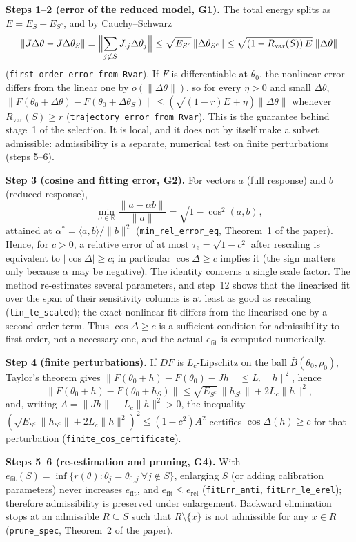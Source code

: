 \textbf{Steps 1--2 (error of the reduced model, G1).} The total energy splits as $E=E_S+E_{S^c}$, and by Cauchy--Schwarz
\[
\|J\Delta\theta-J\Delta\theta_S\|=\Bigl\|\sum_{j\notin S}J_{\cdot j}\Delta\theta_j\Bigr\|\le\sqrt{E_{S^c}}\,\|\Delta\theta_{S^c}\|\le\sqrt{(1-R_{\mathrm{var}}(S))\,E}\;\|\Delta\theta\|
\]
(\texttt{first\_order\_error\_from\_Rvar}). If $F$ is differentiable at $\theta_0$, the nonlinear error differs from the linear one by $o(\|\Delta\theta\|)$, so for every $\eta>0$ and small $\Delta\theta$, $\|F(\theta_0+\Delta\theta)-F(\theta_0+\Delta\theta_S)\|\le(\sqrt{(1-r)E}+\eta)\|\Delta\theta\|$ whenever $R_{\mathrm{var}}(S)\ge r$ (\texttt{trajectory\_error\_from\_Rvar}). This is the guarantee behind stage~1 of the selection. It is local, and it does not by itself make a subset admissible: admissibility is a separate, numerical test on finite perturbations (steps 5--6).

\textbf{Step 3 (cosine and fitting error, G2).} For vectors $a$ (full response) and $b$ (reduced response),
\[
\min_{\alpha\in\mathbb{R}}\frac{\|a-\alpha b\|}{\|a\|}=\sqrt{1-\cos^2(a,b)},
\]
attained at $\alpha^*=\langle a,b\rangle/\|b\|^2$ (\texttt{min\_rel\_error\_eq}, Theorem~1 of the paper). Hence, for $c>0$, a relative error of at most $\tau_e=\sqrt{1-c^2}$ after rescaling is equivalent to $|\cos\Delta|\ge c$; in particular $\cos\Delta\ge c$ implies it (the sign matters only because $\alpha$ may be negative). The identity concerns a single scale factor. The method re-estimates several parameters, and step~12 shows that the linearised fit over the span of their sensitivity columns is at least as good as rescaling (\texttt{lin\_le\_scaled}); the exact nonlinear fit differs from the linearised one by a second-order term. Thus $\cos\Delta\ge c$ is a sufficient condition for admissibility to first order, not a necessary one, and the actual $e_{\mathrm{fit}}$ is computed numerically.

\textbf{Step 4 (finite perturbations).} If $DF$ is $L_c$-Lipschitz on the ball $\bar B(\theta_0,\rho_0)$, Taylor's theorem gives $\|F(\theta_0+h)-F(\theta_0)-Jh\|\le L_c\|h\|^2$, hence
\[
\|F(\theta_0+h)-F(\theta_0+h_S)\|\le\sqrt{E_{S^c}}\,\|h_{S^c}\|+2L_c\|h\|^2,
\]
and, writing $A=\|Jh\|-L_c\|h\|^2>0$, the inequality $(\sqrt{E_{S^c}}\|h_{S^c}\|+2L_c\|h\|^2)^2\le(1-c^2)A^2$ certifies $\cos\Delta(h)\ge c$ for that perturbation (\texttt{finite\_cos\_certificate}).

\textbf{Steps 5--6 (re-estimation and pruning, G4).} With $e_{\mathrm{fit}}(S)=\inf\{r(\theta):\theta_j=\theta_{0,j}\ \forall j\notin S\}$, enlarging $S$ (or adding calibration parameters) never increases $e_{\mathrm{fit}}$, and $e_{\mathrm{fit}}\le e_{\mathrm{rel}}$ (\texttt{fitErr\_anti}, \texttt{fitErr\_le\_erel}); therefore admissibility is preserved under enlargement. Backward elimination stops at an admissible $R\subseteq S$ such that $R\setminus\{x\}$ is not admissible for any $x\in R$ (\texttt{prune\_spec}, Theorem~2 of the paper).

